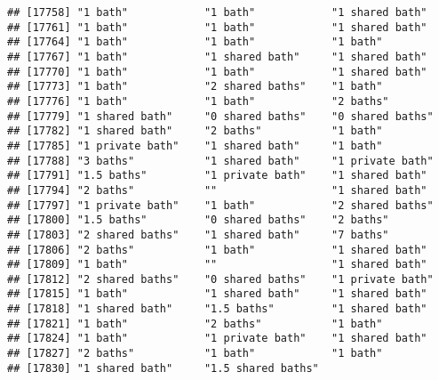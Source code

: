 \documentclass[
]{article}
\begin{document}
\begin{verbatim}
## [17758] "1 bath"            "1 bath"            "1 shared bath"    
## [17761] "1 bath"            "1 bath"            "1 shared bath"    
## [17764] "1 bath"            "1 bath"            "1 bath"           
## [17767] "1 bath"            "1 shared bath"     "1 shared bath"    
## [17770] "1 bath"            "1 bath"            "1 shared bath"    
## [17773] "1 bath"            "2 shared baths"    "1 bath"           
## [17776] "1 bath"            "1 bath"            "2 baths"          
## [17779] "1 shared bath"     "0 shared baths"    "0 shared baths"   
## [17782] "1 shared bath"     "2 baths"           "1 bath"           
## [17785] "1 private bath"    "1 shared bath"     "1 bath"           
## [17788] "3 baths"           "1 shared bath"     "1 private bath"   
## [17791] "1.5 baths"         "1 private bath"    "1 shared bath"    
## [17794] "2 baths"           ""                  "1 shared bath"    
## [17797] "1 private bath"    "1 bath"            "2 shared baths"   
## [17800] "1.5 baths"         "0 shared baths"    "2 baths"          
## [17803] "2 shared baths"    "1 shared bath"     "7 baths"          
## [17806] "2 baths"           "1 bath"            "1 shared bath"    
## [17809] "1 bath"            ""                  "1 shared bath"    
## [17812] "2 shared baths"    "0 shared baths"    "1 private bath"   
## [17815] "1 bath"            "1 shared bath"     "1 shared bath"    
## [17818] "1 shared bath"     "1.5 baths"         "1 shared bath"    
## [17821] "1 bath"            "2 baths"           "1 bath"           
## [17824] "1 bath"            "1 private bath"    "1 shared bath"    
## [17827] "2 baths"           "1 bath"            "1 bath"           
## [17830] "1 shared bath"     "1.5 shared baths"
\end{verbatim}
\end{document}
